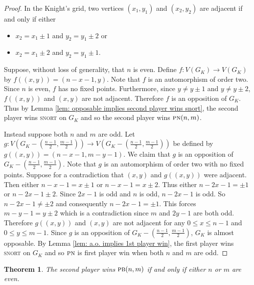 \documentclass[11pt]{article}
\newtheorem{theorem}{Theorem}[section]
\theoremstyle{definition}
\begin{document}
\begin{proof}
    In the Knight's grid, two vertices $(x_1, y_1)$ and $(x_2, y_2)$ are
    adjacent if and only if either 
    \begin{itemize}
        \item $x_2 = x_1 \pm 1$ and $y_2 = y_1 \pm 2$ or 
        \item $x_2 = x_1 \pm 2$ and $y_2 = y_1 \pm 1$.
    \end{itemize}

    Suppose, without loss of generality, that $n$ is even. Define $f: V(G_K)
    \to V(G_K)$ by $f((x,y)) = (n-x-1, y)$. Note that $f$ is an automorphism of
    order two. Since $n$ is even, $f$ has no fixed points. Furthermore, since
    $y\neq y \pm 1$ and $y\neq y \pm 2$, $f((x,y))$ and $(x,y)$ are not
    adjacent. Therefore $f$ is an opposition of $G_K$. Thus by Lemma \ref{lem:
    opposable implies second player wins snort}, the second player wins
    \textsc{snort} on $G_K$ and so the second player wins $\textsc{pn}(n,m)$. 

    Instead suppose both $n$ and $m$ are odd. Let $g: V(G_K - (\frac{n-1}{2},
    \frac{m-1}{2})) \to V(G_K - (\frac{n-1}{2}, \frac{m-1}{2}))$ be defined by
    $g((x,y)) = (n-x-1, m-y-1)$. We claim that $g$ is an opposition of $G_K -
    (\frac{n-1}{2}, \frac{m-1}{2})$. Note that $g$ is an automorphism of order
    two with no fixed points. Suppose for a contradiction that $(x,y)$ and
    $g((x,y))$ were adjacent. Then either $n-x-1 = x\pm 1$ or $n-x-1 = x\pm 2$.
    Thus either $n-2x-1 = \pm 1$ or $n-2x-1 \pm 2$. Since $2x-1$ is odd and $n$
    is odd, $n-2x-1$ is odd. So $n-2x-1 \neq \pm 2$ and consequently $n-2x-1 =
    \pm 1$. This forces $m-y-1 = y\pm 2$ which is a contradiction since $m$ and
    $2y-1$ are both odd. Therefore $g((x,y))$ and $(x,y)$ are not adjacent for
    any $0\leq x\leq n-1$ and $0\leq y\leq m-1$. Since $g$ is an opposition of
    $G_K - (\frac{n-1}{2}, \frac{m-1}{2})$, $G_K$ is almost opposable. By Lemma
    \ref{lem: a.o. implies 1st player win}, the first player wins
    \textsc{snort} on $G_K$ and so $\textsc{pn}$ is first player win when both
    $n$ and $m$ are odd.
\end{proof}

\begin{theorem}
    \label{thm: PB outcomes}
    The second player wins $\textsc{pb}(n,m)$ if and only if either $n$ or $m$
    are even.
\end{theorem}
\end{document}
